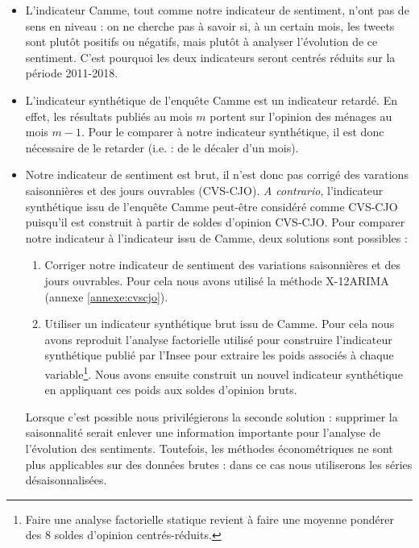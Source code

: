 \documentclass[11pt,french,french]{article}
\let\rmarkdownfootnote\footnote%
\def\footnote{\protect\rmarkdownfootnote}
\begin{document}
\begin{itemize}
\item
  L'indicateur Camme, tout comme notre indicateur de sentiment, n'ont pas de sens en niveau : on ne cherche pas à savoir si, à un certain mois, les tweets sont plutôt positifs ou négatifs, mais plutôt à analyser l'évolution de ce sentiment.
  C'est pourquoi les deux indicateurs seront centrés réduits sur la période 2011-2018.
\item
  L'indicateur synthétique de l'enquête Camme est un indicateur retardé.
  En effet, les résultats publiés au mois \(m\) portent sur l'opinion des ménages au mois \(m-1\).
  Pour le comparer à notre indicateur synthétique, il est donc nécessaire de le retarder (i.e. : de le décaler d'un mois).
\item
  Notre indicateur de sentiment est brut, il n'est donc pas corrigé des varations saisonnières et des jours ouvrables (CVS-CJO).
  \emph{A contrario}, l'indicateur synthétique issu de l'enquête Camme peut-être considéré comme CVS-CJO puisqu'il est construit à partir de soldes d'opinion CVS-CJO. Pour comparer notre indicateur à l'indicateur issu de Camme, deux solutions sont possibles :

  \begin{enumerate}
  \def\labelenumi{\arabic{enumi}.}
  \item
    Corriger notre indicateur de sentiment des variations saisonnières et des jours ouvrables.
    Pour cela nous avons utilisé la méthode X-12ARIMA (annexe \ref{annexe:cvscjo}).
  \item
    Utiliser un indicateur synthétique brut issu de Camme.
    Pour cela nous avons reproduit l'analyse factorielle utilisé pour construire l'indicateur synthétique publié par l'Insee pour extraire les poids associés à chaque variable\footnote{Faire une analyse factorielle statique revient à faire une moyenne pondérer des 8 soldes d'opinion centrés-réduits.}.
    Nous avons ensuite construit un nouvel indicateur synthétique en appliquant ces poids aux soldes d'opinion bruts.
  \end{enumerate}

  Lorsque c'est possible nous privilégierons la seconde solution : supprimer la saisonnalité serait enlever une information importante pour l'analyse de l'évolution des sentiments.
  Toutefois, les méthodes économétriques ne sont plus applicables sur des données brutes : dans ce cas nous utiliserons les séries désaisonnalisées.
\end{itemize}
\end{document}
